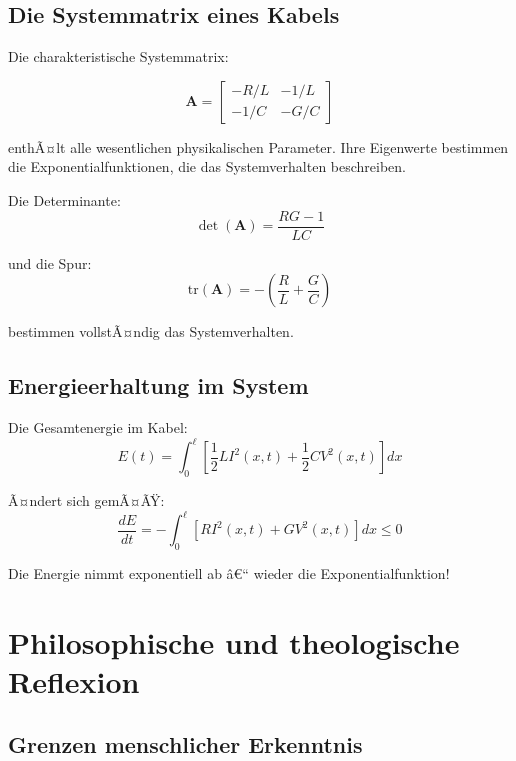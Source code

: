 ﻿\documentclass[12pt,a4paper]{article}
\theoremstyle{definition}
\theoremstyle{remark}
\begin{document}
\subsection{Die Systemmatrix eines Kabels}

Die charakteristische Systemmatrix:

\begin{equation}
\mathbf{A} = \begin{bmatrix} -R/L & -1/L \\ -1/C & -G/C \end{bmatrix}
\end{equation}

enthÃ¤lt alle wesentlichen physikalischen Parameter. Ihre Eigenwerte bestimmen die Exponentialfunktionen, die das Systemverhalten beschreiben.

Die Determinante:
\begin{equation}
\det(\mathbf{A}) = \frac{RG - 1}{LC}
\end{equation}

und die Spur:
\begin{equation}
\text{tr}(\mathbf{A}) = -\left(\frac{R}{L} + \frac{G}{C}\right)
\end{equation}

bestimmen vollstÃ¤ndig das Systemverhalten.

\subsection{Energieerhaltung im System}

Die Gesamtenergie im Kabel:
\begin{equation}
E(t) = \int_0^\ell \left[\frac{1}{2}L I^2(x,t) + \frac{1}{2}C V^2(x,t)\right] dx
\end{equation}

Ã¤ndert sich gemÃ¤ÃŸ:
\begin{equation}
\frac{dE}{dt} = -\int_0^\ell \left[R I^2(x,t) + G V^2(x,t)\right] dx \leq 0
\end{equation}

Die Energie nimmt exponentiell ab â€“ wieder die Exponentialfunktion!

\section{Philosophische und theologische Reflexion}

\subsection{Grenzen menschlicher Erkenntnis}
\end{document}
